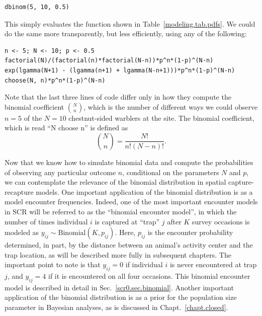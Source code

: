 \begin{verbatim}
dbinom(5, 10, 0.5)
\end{verbatim}
This simply evaluates the function shown in
Table~\ref{modeling.tab.pdfs}. We could do the same more transparently, but
less efficiently, using any of the following:
\begin{verbatim}
n <- 5; N <- 10; p <- 0.5
factorial(N)/(factorial(n)*factorial(N-n))*p^n*(1-p)^(N-n)
exp(lgamma(N+1) - (lgamma(n+1) + lgamma(N-n+1)))*p^n*(1-p)^(N-n)
choose(N, n)*p^n*(1-p)^(N-n)
\end{verbatim}
Note that the last three lines of code differ only in how they compute the
binomial coefficient $\binom{N}{n}$, which is the number of different ways
we could observe $n=5$ of the $N=10$ chestnut-sided warblers at the site. The
binomial coefficient, which is read ``N choose n'' is defined as
\begin{equation}
  \label{eq:1}
  \binom{N}{n} = \frac{N!}{n!(N-n)!}.
\end{equation}

Now that we know how to simulate binomial data and compute the
probabilities of observing any particular outcome $n$, conditional on the
parameters $N$ and $p$, we can contemplate the relevance of the
binomial distribution in spatial capture-recapture models. One
important application of the binomial distribution is as a model encounter
frequencies. Indeed, one of the most important encounter models in SCR
will be referred to as the ``binomial encounter model'', in which
the number of times individual $i$ is captured at ``trap'' $j$ after
$K$ survey occasions is
modeled as $y_{ij} \sim \text{Binomial}(K, p_{ij})$. Here, $p_{ij}$ is the
encounter probability determined, in part, by the distance between an
animal's activity center and the trap location, as will be described
more fully in subsequent chapters. The important point to note is
that $y_{ij}=0$ if individual $i$ is never encountered at trap $j$,
and $y_{ij}=4$ if it is encountered on all four occasions. This
binomial encounter model is
described in detail in Sec.~\ref{scr0.sec.binomial}.
Another important application of the binomial distribution is as a
prior for the population size parameter in Bayesian analyses, as is
discussed in Chapt.~\ref{chapt.closed}.





